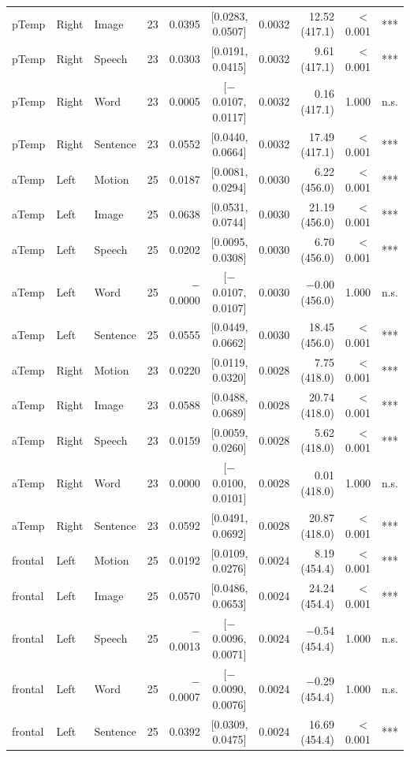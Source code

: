 \begin{table}[h]
\begin{tabular}{lllrrcrrrl}
pTemp & Right & Image & 23 & 0.0395 & [0.0283, 0.0507] & 0.0032 & 12.52 (417.1) & $<$0.001 & *** \\
pTemp & Right & Speech & 23 & 0.0303 & [0.0191, 0.0415] & 0.0032 & 9.61 (417.1) & $<$0.001 & *** \\
pTemp & Right & Word & 23 & 0.0005 & [$-$0.0107, 0.0117] & 0.0032 & 0.16 (417.1) & 1.000 & n.s. \\
pTemp & Right & Sentence & 23 & 0.0552 & [0.0440, 0.0664] & 0.0032 & 17.49 (417.1) & $<$0.001 & *** \\
aTemp & Left & Motion & 25 & 0.0187 & [0.0081, 0.0294] & 0.0030 & 6.22 (456.0) & $<$0.001 & *** \\
aTemp & Left & Image & 25 & 0.0638 & [0.0531, 0.0744] & 0.0030 & 21.19 (456.0) & $<$0.001 & *** \\
aTemp & Left & Speech & 25 & 0.0202 & [0.0095, 0.0308] & 0.0030 & 6.70 (456.0) & $<$0.001 & *** \\
aTemp & Left & Word & 25 & $-$0.0000 & [$-$0.0107, 0.0107] & 0.0030 & $-$0.00 (456.0) & 1.000 & n.s. \\
aTemp & Left & Sentence & 25 & 0.0555 & [0.0449, 0.0662] & 0.0030 & 18.45 (456.0) & $<$0.001 & *** \\
aTemp & Right & Motion & 23 & 0.0220 & [0.0119, 0.0320] & 0.0028 & 7.75 (418.0) & $<$0.001 & *** \\
aTemp & Right & Image & 23 & 0.0588 & [0.0488, 0.0689] & 0.0028 & 20.74 (418.0) & $<$0.001 & *** \\
aTemp & Right & Speech & 23 & 0.0159 & [0.0059, 0.0260] & 0.0028 & 5.62 (418.0) & $<$0.001 & *** \\
aTemp & Right & Word & 23 & 0.0000 & [$-$0.0100, 0.0101] & 0.0028 & 0.01 (418.0) & 1.000 & n.s. \\
aTemp & Right & Sentence & 23 & 0.0592 & [0.0491, 0.0692] & 0.0028 & 20.87 (418.0) & $<$0.001 & *** \\
frontal & Left & Motion & 25 & 0.0192 & [0.0109, 0.0276] & 0.0024 & 8.19 (454.4) & $<$0.001 & *** \\
frontal & Left & Image & 25 & 0.0570 & [0.0486, 0.0653] & 0.0024 & 24.24 (454.4) & $<$0.001 & *** \\
frontal & Left & Speech & 25 & $-$0.0013 & [$-$0.0096, 0.0071] & 0.0024 & $-$0.54 (454.4) & 1.000 & n.s. \\
frontal & Left & Word & 25 & $-$0.0007 & [$-$0.0090, 0.0076] & 0.0024 & $-$0.29 (454.4) & 1.000 & n.s. \\
frontal & Left & Sentence & 25 & 0.0392 & [0.0309, 0.0475] & 0.0024 & 16.69 (454.4) & $<$0.001 & *** \\

\end{tabular}
\end{table}
